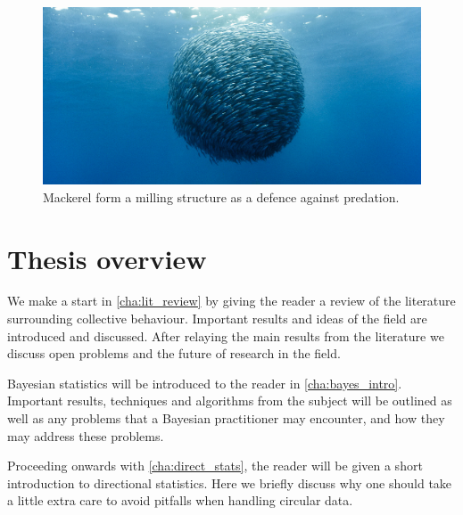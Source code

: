 \begin{figure}[tb]
    \includegraphics[width=\textwidth]{milling.jpg}
    \caption{Mackerel form a milling structure as a defence against predation.}
    \label{fig:milling}
\end{figure}

\section{Thesis overview}
\label{sec:overview_of_thesis}

We make a start in \cref{cha:lit_review} by giving the reader a review of the
literature surrounding collective behaviour. Important results and ideas of the
field are introduced and discussed. After relaying the main results from the
literature we discuss open problems and the future of research in the field.

Bayesian statistics will be introduced to the reader in \cref{cha:bayes_intro}.
Important results, techniques and algorithms from the subject will be outlined
as well as any problems that a Bayesian practitioner may encounter, and how
they may address these problems.

Proceeding onwards with \cref{cha:direct_stats}, the reader will be given a
short introduction to directional statistics. Here we briefly discuss why one
should take a little extra care to avoid pitfalls when handling circular data.



